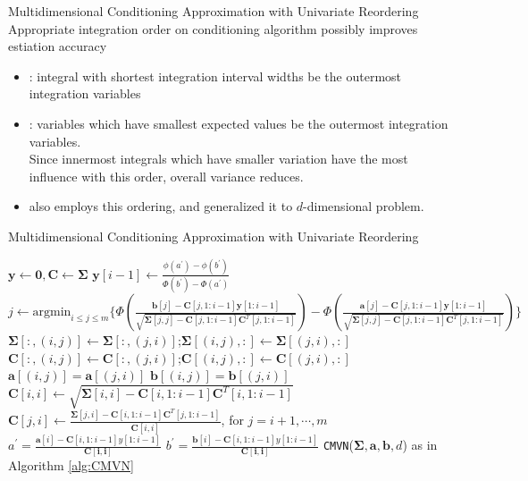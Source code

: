 \begin{frame}{Multidimensional Conditioning Approximation with Univariate Reordering}
\footnotesize
Appropriate integration order on conditioning algorithm possibly improves estiation accuracy
\begin{itemize}
	\item \citet{schervish1984algorithm} : integral with shortest integration interval widths be the outermost integration variables
	\item \citet{gibson1994monte} : variables which have smallest expected values be the outermost integration variables.\\
	Since innermost integrals which have smaller variation have the most influence with this order, overall variance reduces.
	\item \citet{trinh2015bivariate} also employs this ordering, and \citet{cao2019hierarchical} generalized it to $d$-dimensional problem.
\end{itemize}
\end{frame}

\begin{frame}{Multidimensional Conditioning Approximation with Univariate Reordering}
\begin{algorithm}[H]
	\caption{d-dimensional conditioning algorithm with univariate reordering}
	\begin{algorithmic}[1]
		\tiny
		\State $\mathbf{y}\leftarrow\mathbf{0},\mathbf{C}\leftarrow\boldsymbol{\Sigma}$
		\State $\mathbf{y}[i-1]\leftarrow\frac{\phi(a^\prime)-\phi(b^\prime)}{\Phi(b^\prime)-\Phi(a^\prime)}$
		\EndIf
		\State $j\leftarrow\text{argmin}_{i\leq j\leq m}\{\Phi(\frac{\mathbf{b}[j]-\mathbf{C}[j,1:i-1]\mathbf{y}[1:i-1]}{\sqrt{\boldsymbol{\Sigma}[j,j]-\mathbf{C}[j,1:i-1]\mathbf{C}^T[j,1:i-1]}})-\Phi(\frac{\mathbf{a}[j]-\mathbf{C}[j,1:i-1]\mathbf{y}[1:i-1]}{\sqrt{\boldsymbol{\Sigma}[j,j]-\mathbf{C}[j,1:i-1]\mathbf{C}^T[j,1:i-1]}})\}$
		\State $\boldsymbol{\Sigma}[:,(i,j)]\leftarrow\boldsymbol{\Sigma}[:,(j,i)]$;$\boldsymbol{\Sigma}[(i,j),:]\leftarrow\boldsymbol{\Sigma}[(j,i),:]$
		\State $\mathbf{C}[:,(i,j)]\leftarrow\mathbf{C}[:,(j,i)]$;$\mathbf{C}[(i,j),:]\leftarrow\mathbf{C}[(j,i),:]$
		\State $\mathbf{a}[(i,j)]=\mathbf{a}[(j,i)]$
		\State $\mathbf{b}[(i,j)]=\mathbf{b}[(j,i)]$
		\State $\mathbf{C}[i,i]\leftarrow\sqrt{\boldsymbol{\Sigma}[i,i]-\mathbf{C}[i,1:i-1]\mathbf{C}^T[i,1:i-1]}$
		\State $\mathbf{C}[j,i]\leftarrow \frac{\boldsymbol{\Sigma}[j,i]-\mathbf{C}[i,1:i-1]\mathbf{C}^T[j,1:i-1]}{\mathbf{C}[i,i]}$, for $j=i+1,\cdots,m$
		\State $a^\prime=\frac{\mathbf{a}[i]-\mathbf{C}[i,1:i-1]y[1:i-1]}{\mathbf{C[i,i]}}$
		\State $b^\prime=\frac{\mathbf{b}[i]-\mathbf{C}[i,1:i-1]y[1:i-1]}{\mathbf{C[i,i]}}$
		\EndFor
		\State\Return \texttt{CMVN}($\boldsymbol{\Sigma},\mathbf{a},\mathbf{b},d$) as in Algorithm \ref{alg:CMVN}
		\EndProcedure
	\end{algorithmic}\label{alg:RCMVN}
\end{algorithm}

\end{frame}